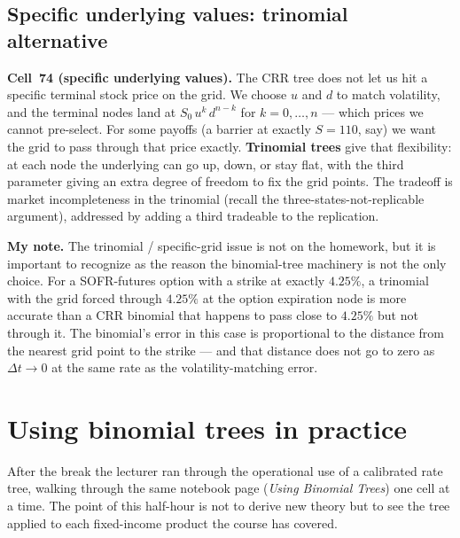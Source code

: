 \subsection{Specific underlying values: trinomial alternative}\label{L8-sec:trinomial}

\begin{keyblock}
\textbf{Cell~74 (specific underlying values).}
The CRR tree does not let us hit a specific terminal stock price
on the grid. We choose $u$ and $d$ to match volatility, and the
terminal nodes land at $S_0\,u^k\,d^{n-k}$ for $k = 0, \ldots, n$ ---
which prices we cannot pre-select. For some payoffs (a barrier at
exactly $S = 110$, say) we want the grid to pass through that price
exactly. \textbf{Trinomial trees} give that flexibility: at each
node the underlying can go up, down, or stay flat, with the third
parameter giving an extra degree of freedom to fix the grid points.
The tradeoff is market incompleteness in the trinomial (recall the
three-states-not-replicable argument), addressed by adding a third
tradeable to the replication.
\end{keyblock}

\begin{checkpoint}
\textbf{My note.} The trinomial / specific-grid issue is not on
the homework, but it is important to recognize as the reason the
binomial-tree machinery is not the only choice. For a SOFR-futures
option with a strike at exactly $4.25\%$, a trinomial with the grid
forced through $4.25\%$ at the option expiration node is more
accurate than a CRR binomial that happens to pass close to $4.25\%$
but not through it. The binomial's error in this case is
proportional to the distance from the nearest grid point to the
strike --- and that distance does not go to zero as
$\Delta t \to 0$ at the same rate as the volatility-matching error.
\end{checkpoint}

\section{Using binomial trees in practice}\label{L8-sec:usingbintrees}

After the break the lecturer ran through the operational use of a
calibrated rate tree, walking through the same notebook page
(\emph{Using Binomial Trees}) one cell at a time. The point of this
half-hour is not to derive new theory but to see the tree applied to
each fixed-income product the course has covered.

